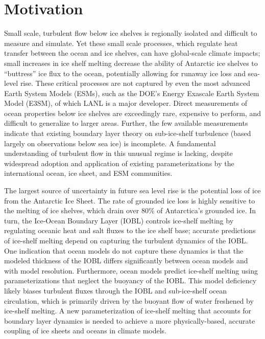 \documentclass[letterpaper,10pt]{report}
\begin{document}
\tableofcontents{}
\chapter{Motivation}

Small scale, turbulent flow below ice shelves is regionally isolated and difficult to measure and simulate.  Yet these small scale processes, which regulate heat transfer between the ocean and ice shelves, can have global-scale climate impacts; small increases in ice shelf melting decrease the ability of Antarctic ice shelves to “buttress” ice flux to the ocean, potentially allowing for runaway ice loss and sea-level rise.  These critical processes are not captured by even the most advanced Earth System Models (ESMs), such as the DOE’s Energy Exascale Earth System Model (E3SM), of which LANL is a major developer. Direct measurements of ocean properties below ice shelves are exceedingly rare, expensive to perform, and difficult to generalize to larger areas. Further, the few available measurements indicate that existing boundary layer theory on sub-ice-shelf turbulence (based largely on observations below sea ice) is incomplete. A fundamental understanding of turbulent flow in this unusual regime is lacking, despite widespread adoption and application of existing parameterizations by the international ocean, ice sheet, and ESM communities.

The largest source of uncertainty in future sea level rise is the potential loss of ice from the Antarctic Ice Sheet. The rate of grounded ice loss is highly sensitive to the melting of ice shelves, which drain over 80\% of Antarctica’s grounded ice. In turn, the Ice-Ocean Boundary Layer (IOBL) controls ice-shelf melting by regulating oceanic heat and salt fluxes to the ice shelf base; accurate predictions of ice-shelf melting depend on capturing the turbulent dynamics of the IOBL. One indication that ocean models do not capture these dynamics is that the modeled thickness of the IOBL differs significantly between ocean models and with model resolution. Furthermore, ocean models predict ice-shelf melting using parameterizations that neglect the buoyancy of the IOBL. This model deficiency likely biases turbulent fluxes through the IOBL and sub-ice-shelf ocean circulation, which is primarily driven by the buoyant flow of water freshened by ice-shelf melting. A new parameterization of ice-shelf melting that accounts for boundary layer dynamics is needed to achieve a more physically-based, accurate coupling of ice sheets and oceans in climate models.
\end{document}
